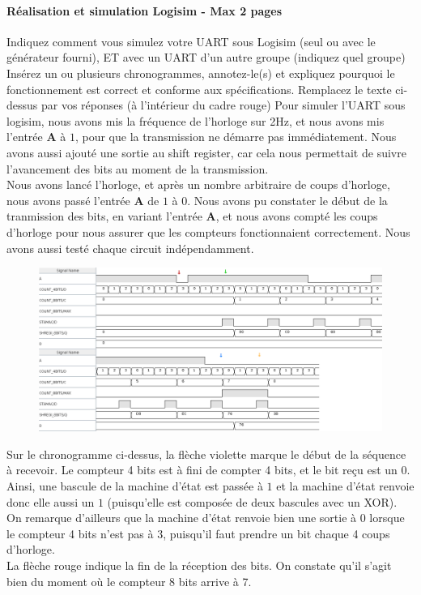 \documentclass[a4paper]{article} %
\begin{document}
\begin{tcolorbox}[colframe=Monokaimagenta,colback=white]
\paragraph{Réalisation et simulation Logisim - Max 2 pages}
Indiquez comment vous simulez votre UART sous Logisim (seul ou avec le générateur fourni), ET avec un UART d’un autre groupe (indiquez quel groupe)
Insérez un ou plusieurs chronogrammes, annotez-le(s) et expliquez pourquoi le fonctionnement est correct et conforme aux spécifications.
Remplacez le texte ci-dessus par vos réponses (à l’intérieur du cadre rouge)
Pour simuler l'UART sous logisim, nous avons mis la fréquence de l'horloge sur 2Hz, et nous avons mis l'entrée \textbf{A} à $1$, pour que la transmission ne démarre pas immédiatement. Nous avons aussi ajouté une sortie au shift register, car cela nous permettait de suivre l'avancement des bits au moment de la transmission.\\
Nous avons lancé l'horloge, et après un nombre arbitraire de coups d'horloge, nous avons passé l'entrée \textbf{A} de $1$ à $0$. Nous avons pu constater le début de la tranmission des bits, en variant l'entrée \textbf{A}, et nous avons compté les coups d'horloge pour nous assurer que les compteurs fonctionnaient correctement.
Nous avons aussi testé chaque circuit indépendamment.
\\
\begin{figure}[H]
\centering
    \includegraphics[width=1\textwidth]{src/CHRONO_UART_1.png}
    \label{fig:countBase}
\end{figure}
Sur le chronogramme ci-dessus, la flèche violette marque le début de la séquence à recevoir. Le compteur 4 bits est à fini de compter 4 bits, et le bit reçu est un $0$. Ainsi, une bascule de la machine d'état est passée à $1$ et la machine d'état renvoie donc elle aussi un $1$ (puisqu'elle est composée de deux bascules avec un XOR). On remarque d'ailleurs que la machine d'état renvoie bien une sortie à $0$ lorsque le compteur 4 bits n'est pas à 3, puisqu'il faut prendre un bit chaque 4 coups d'horloge.\\
La flèche rouge indique la fin de la réception des bits. On constate qu'il s'agit bien du moment où le compteur 8 bits arrive à 7.

\end{tcolorbox}
\end{document}
